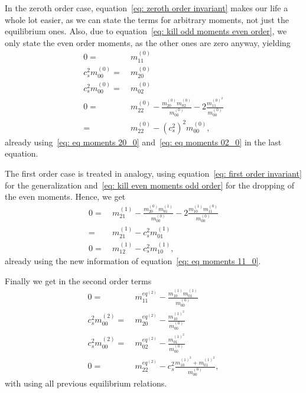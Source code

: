 In the zeroth order case, equation~\eqref{eq: zeroth order invariant} makes our life a whole lot easier, as we can state the terms for arbitrary moments, not just the equilibrium ones.
Also, due to equation~\eqref{eq: kill odd moments even order}, we only state the even order moments, as the other ones are zero anyway, yielding
\begin{align}
  \label{eq: eq moments 11_0}
  0 = &\ m_{11}^{(0)}
  \\
  \label{eq: eq moments 20_0}
  c_s^2 m_{00}^{(0)} = &\ m_{20}^{(0)}
  \\
  \label{eq: eq moments 02_0}
  c_s^2 m_{00}^{(0)} = &\ m_{02}^{(0)}
  \\\nonumber
  0 = &\ m_{22}^{(0)} - \frac{ m_{20}^{(0)} m_{02}^{(0)} }{m_{00}^{(0)}} - 2\frac{ m_{11}^{{(0)}^2}}{m_{00}^{(0)}}
  \\ = &\ m_{22}^{(0)} - {(c_s^2)}^2 m_{00}^{(0)},
  \label{eq: eq moments 22_0}
\end{align}
already using~\eqref{eq: eq moments 20_0} and~\eqref{eq: eq moments 02_0} in the last equation.

The first order case is treated in analogy, using equation~\eqref{eq: first order invariant} for the generalization and~\eqref{eq: kill even moments odd order} for the dropping of the even moments.
Hence, we get
\begin{align}\nonumber
  0 = &\ m_{21}^{(1)}
  - \frac{m_{20}^{(0)} m_{01}^{(1)}}{m_{00}^{(0)}}
  - 2\frac{m_{10}^{(1)} m_{11}^{(0)}}{m_{00}^{(0)}}
  \\
  \label{eq: eq moments 21_1}
  = &\ m_{21}^{(1)}
  - c_s^2 m_{01}^{(1)}
  \\
  \label{eq: eq moments 12_1}
  0 = &\ m_{12}^{(1)}
  - c_s^2 m_{10}^{(1)},
\end{align}
already using the new information of equation~\eqref{eq: eq moments 11_0}.

Finally we get in the second order terms
\begin{align}
    \label{eq: eq moments 11_2}
    0 =&\ m_{11}^{eq^{(2)}} - \frac{ m_{10}^{(1)} m_{01}^{(1)} }{ m_{00}^{(0)}}
    \\
    \label{eq: eq moments 20_2}
    c_s^2 m_{00}^{(2)} =&\ m_{20}^{eq^{(2)}} - \frac{ m_{10}^{{(1)}^2}}{m_{00}^{(0)}}
    \\
    \label{eq: eq moments 02_2}
    c_s^2 m_{00}^{(2)} =&\ m_{02}^{eq^{(2)}} - \frac{ m_{01}^{{(1)}^2}}{m_{00}^{(0)}}
    \\
    \label{eq: eq moments 22_2}
    0 = &\ m_{22}^{eq^{(2)}} - c_s^2 \frac{ m_{10}^{{(1)}^2}+m_{01}^{{(1)}^2}}{m_{00}^{(0)}},
\end{align}
with using all previous equilibrium relations.
